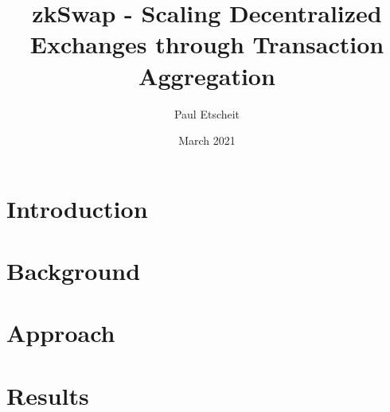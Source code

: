 \documentclass[11pt,twoside,a4paper,final]{book}
\title{zkSwap - Scaling Decentralized Exchanges through Transaction Aggregation}
\author{Paul Etscheit}
\date{March 2021}
\begin{document}
\begin{titlepage}
    \maketitle
\end{titlepage}

\tableofcontents
\section{Introduction}


\section{Background}


\section{Approach}


\section{Results}





\end{document}
